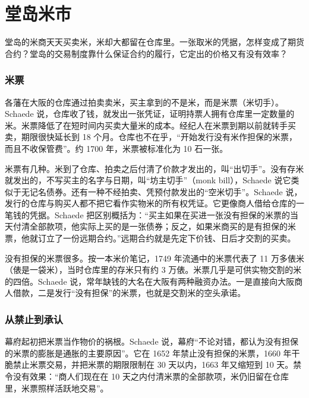 \section{堂岛米市}\label{sec:toku-dojima}

堂岛的米商天天买卖米，米却大都留在仓库里。一张取米的凭据，怎样变成了期货合约？堂岛的交易制度靠什么保证合约的履行，它定出的价格又有没有效率？

\subsubsection{米票}
各藩在大阪的仓库通过拍卖卖米，买主拿到的不是米，而是米票（米切手）。Schaede 说，仓库收了钱，就发出一张凭证，证明持票人拥有仓库里一定数量的米\cite{schaede1989}。米票降低了在短时间内买卖大量米的成本。经纪人在米票到期以前就转手买卖，期限很快延长到 18 个月。仓库也不在乎，“开始发行没有米作担保的米票，而且不收保管费”\cite{schaede1989}。约 1700 年，米票被标准化为 10 石一张\cite{schaede1989}。

米票有几种。米到了仓库、拍卖之后付清了价款才发出的，叫“出切手”。没有存米就发出的，不写买主的名字与日期，叫“坊主切手”（monk bill），Schaede 说它类似于无记名债券\cite{schaede1989}。还有一种不经拍卖、凭预付款发出的“空米切手”。Schaede 说，发行的仓库与购买人都不把它看作实物米的所有权凭证\cite{schaede1989}。它更像商人借给仓库的一笔钱的凭据。Schaede 把区别概括为：“买主如果在买进一张没有担保的米票的当天付清全部款项，他实际上买的是一张债券；反之，如果米商买的是有担保的米票，他就订立了一份远期合约。”\cite{schaede1989}远期合约就是先定下价钱、日后才交割的买卖。

没有担保的米票很多。按一本米价笔记，1749 年流通中的米票代表了 11 万多俵米（俵是一袋米），当时仓库里的存米只有约 3 万俵。米票几乎是可供实物交割的米的四倍\cite{schaede1989}。Schaede 说，常年缺钱的大名在大阪有两种融资办法。一是直接向大阪商人借款，二是发行“没有担保”的米票，也就是交割米的空头承诺\cite{schaede1989}。

\subsubsection{从禁止到承认}
幕府起初把米票当作物价的祸根。Schaede 说，幕府“不论对错，都认为没有担保的米票的膨胀是通胀的主要原因”。它在 1652 年禁止没有担保的米票，1660 年干脆禁止米票交易，并把米票的期限限制在 30 天以内，1663 年又缩短到 10 天\cite{schaede1989}。禁令没有效果：“商人们现在在 10 天之内付清米票的全部款项，米仍旧留在仓库里，米票照样活跃地交易”\cite{schaede1989}。

